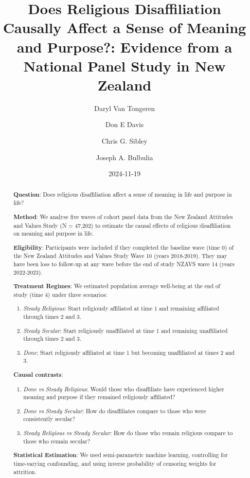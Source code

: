 \documentclass[
  single column]{article}
\title{Does Religious Disaffiliation Causally Affect a Sense of Meaning
and Purpose?: Evidence from a National Panel Study in New Zealand}
\author{Daryl Van Tongeren}
\affil{%
             \small{     Hope College
          ORCID \textcolor[HTML]{A6CE39}{\aiOrcid} ~ }
              }
\author{Don E Davis}
\affil{%
             \small{     Georgia State University
          ORCID \textcolor[HTML]{A6CE39}{\aiOrcid} ~ }
              }
\author{Chris G. Sibley}
\affil{%
             \small{     School of Psychology, University of Auckland
          ORCID \textcolor[HTML]{A6CE39}{\aiOrcid} ~ }
              }
\author{Joseph A. Bulbulia}
\affil{%
             \small{     Victoria University of Wellington, New Zealand
          ORCID \textcolor[HTML]{A6CE39}{\aiOrcid} ~ }
              }
\date{2024-11-19}
\begin{document}
\maketitle
\begin{abstract}
\textbf{Question}: Does religious disaffiliation affect a sense of
meaning in life and purpose in life?

\textbf{Method}: We analyse five waves of cohort panel data from the New
Zealand Attitudes and Values Study (N = 47,202) to estimate the causal
effects of religious disaffiliation on meaning and purpose in life.

\textbf{Eligibility}: Participants were included if they completed the
baseline wave (time 0) of the New Zealand Attitudes and Values Study
Wave 10 (years 2018-2019). They may have been loss to follow-up at any
wave before the end of study NZAVS wave 14 (years 2022-2023).

\textbf{Treatment Regimes}: We estimated population average well-being
at the end of study (time 4) under three scenarios:

\begin{enumerate}
\def\labelenumi{\arabic{enumi}.}
\item
  \emph{Steady Religious}: Start religiously affiliated at time 1 and
  remaining affiliated through times 2 and 3.
\item
  \emph{Steady Secular}: Start religiously unaffiliated at time 1 and
  remaining unaffiliated through times 2 and 3.
\item
  \emph{Done}: Start religiously affiliated at time 1 but becoming
  unaffiliated at times 2 and 3.
\end{enumerate}

\textbf{Causal contrasts}:

\begin{enumerate}
\def\labelenumi{\arabic{enumi}.}
\item
  \emph{Done vs Steady Religious}: Would those who disaffiliate have
  experienced higher meaning and purpose if they remained religiously
  affiliated?
\item
  \emph{Done vs Steady Secular}: How do disaffiliates compare to those
  who were consistently secular?
\item
  \emph{Steady Religious vs Steady Secular}: How do those who remain
  religious compare to those who remain secular?
\end{enumerate}

\textbf{Statistical Estimation}: We used semi-parametric machine
learning, controlling for time-varying confounding, and using inverse
probability of censoring weights for attrition.


\end{abstract}
\end{document}
